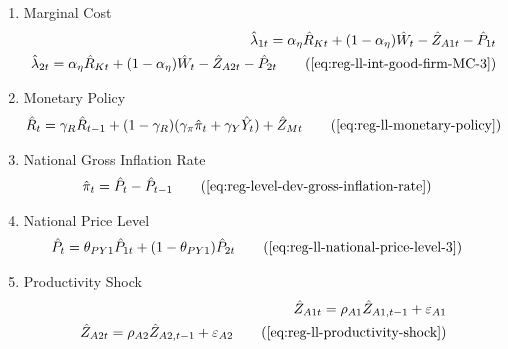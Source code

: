 \documentclass[../thesis.tex]{subfiles}
\begin{document}
{\begin{enumerate}
\begin{comment}
	
		\item Marginal Rates of Substitution of Factors
\begin{align}
	\hat{K}_{1 t} - \hat{L}_{1 t} = \hat{W}_{t} - \hat{R}_{K t} \nonumber \\
	\hat{K}_{2 t} - \hat{L}_{2 t} = \hat{W}_{t} - \hat{R}_{K t} \tag{\ref{eq:reg-ll-int-good-firm-TMRS}}
\end{align}	
	
\end{comment}
		

		
		\item Marginal Cost
		\begin{alignat}{2}
			\hat{\lambda}_{1 t} = {\alpha_{\eta}} \hat{R}_{Kt} + (1- {\alpha_{\eta}}) \hat{W}_{t} - \hat{Z}_{A1 t} - \hat{P}_{1 t} \nonumber \\
			\hat{\lambda}_{2 t} = {\alpha_{\eta}} \hat{R}_{Kt} + (1- {\alpha_{\eta}}) \hat{W}_{t} - \hat{Z}_{A2 t} - \hat{P}_{2 t} \tag{\ref{eq:reg-ll-int-good-firm-MC-3}}
		\end{alignat}
		
		\item Monetary Policy
		\begin{align}
			& \hat{R}_t = \gamma_R \hat{R}_{t-1} + (1-\gamma_R)(\gamma_\pi \hat{\pi}_t + \gamma_Y \hat{Y}_t) + \hat{Z}_{Mt} \tag{\ref{eq:reg-ll-monetary-policy}}
		\end{align}
		
		\item National Gross Inflation Rate
		\begin{align}
			\hat{\pi}_{t} &= \hat{P}_{t} - \hat{P}_{t-1} \tag{\ref{eq:reg-level-dev-gross-inflation-rate}}
		\end{align}
		
		\item National Price Level
		\begin{alignat}{2}
			\hat{P}_{t} &= \theta_{PY1} \hat{P}_{1t} + (1-\theta_{PY1}) \hat{P}_{2t} \tag{\ref{eq:reg-ll-national-price-level-3}}
		\end{alignat}
		
		\item Productivity Shock
		\begin{alignat}{2}
			\hat{Z}_{A1 t} = \rho_{A1} \hat{Z}_{A1, t-1} + \varepsilon_{A1} \nonumber \\
			\hat{Z}_{A2 t} = \rho_{A2} \hat{Z}_{A2, t-1} + \varepsilon_{A2} \tag{\ref{eq:reg-ll-productivity-shock}}
		\end{alignat}
		

\end{enumerate}}
\end{document}
